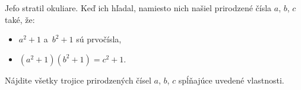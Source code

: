 \createTaskHeader
Jefo stratil okuliare. Keď ich hľadal, namiesto nich našiel prirodzené čísla $a$, $b$, $c$ také, že:
\begin{itemize}
    \item $a^2 + 1$ a~$b^2 + 1$ sú prvočísla,
    \item $(a^2 + 1)(b^2 + 1) = c^2 + 1$.
\end{itemize}
Nájdite všetky trojice prirodzených čísel $a$, $b$, $c$ spĺňajúce uvedené vlastnosti.